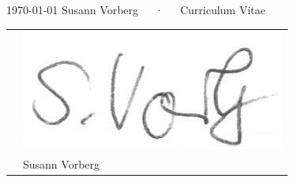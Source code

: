 \documentclass[11pt, a4paper]{awesome-cv}
\begin{document}
\makecvheader

\makecvfooter
  {\today}
  {Susann Vorberg~~~·~~~Curriculum Vitae}
  {\thepage}











%


\begin{table}[b]
\begin{tabular}{ p{}  l }
   &   \includegraphics[height=1.5\baselineskip]{./img/unterschrift_noline.png} \\ \cline{2-2}
   &  Susann Vorberg
\end{tabular}
\end{table}
    
   




\end{document}
